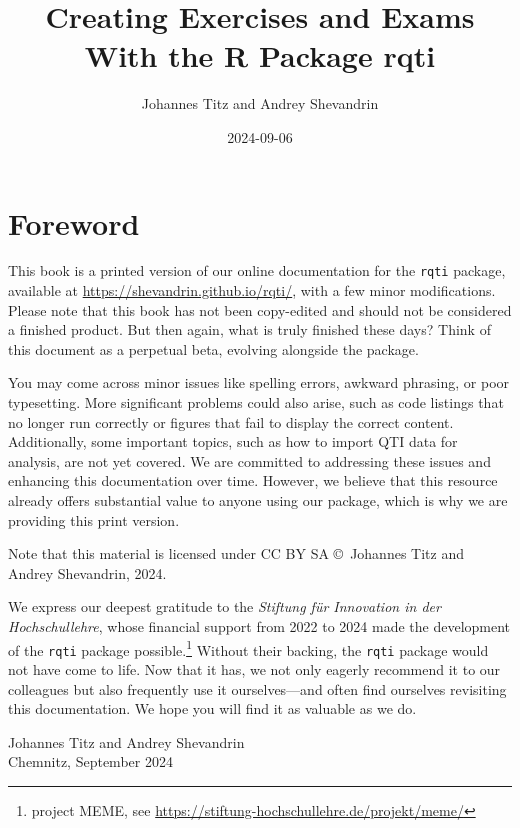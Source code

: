 \documentclass[twoside]{tufte-book}
\title{Creating Exercises and Exams With the R Package rqti}
\author{Johannes Titz and Andrey Shevandrin}
\date{2024-09-06}
\begin{document}
\maketitle


\fancyhead{}
{
\setcounter{tocdepth}{1}
\tableofcontents
}

\chapter*{Foreword}\label{foreword}

This book is a printed version of our online documentation for the \texttt{rqti} package, available at \url{https://shevandrin.github.io/rqti/}, with a few minor modifications. Please note that this book has not been copy-edited and should not be considered a finished product. But then again, what is truly finished these days? Think of this document as a perpetual beta, evolving alongside the package.

You may come across minor issues like spelling errors, awkward phrasing, or poor typesetting. More significant problems could also arise, such as code listings that no longer run correctly or figures that fail to display the correct content. Additionally, some important topics, such as how to import QTI data for analysis, are not yet covered. We are committed to addressing these issues and enhancing this documentation over time. However, we believe that this resource already offers substantial value to anyone using our package, which is why we are providing this print version.

Note that this material is licensed under CC BY SA \copyright\ Johannes Titz and Andrey Shevandrin, 2024.

We express our deepest gratitude to the \emph{Stiftung für Innovation in der Hochschullehre}, whose financial support from 2022 to 2024 made the development of the \texttt{rqti} package possible.\footnote{project MEME, see \url{https://stiftung-hochschullehre.de/projekt/meme/}} Without their backing, the \texttt{rqti} package would not have come to life. Now that it has, we not only eagerly recommend it to our colleagues but also frequently use it ourselves---and often find ourselves revisiting this documentation. We hope you will find it as valuable as we do.

\vspace{0.5cm}

\noindent Johannes Titz and Andrey Shevandrin\\
Chemnitz, September 2024
\end{document}
